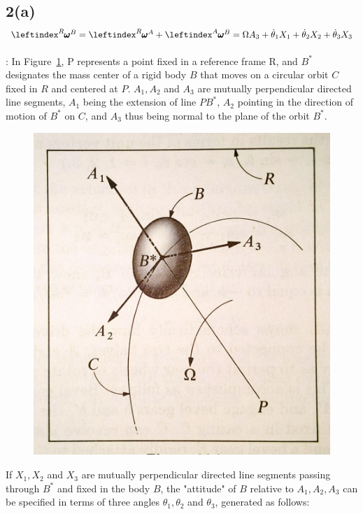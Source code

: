 \subsection{2(a) $\lx{^R}{\pmb \omega}^B = \lx{^R}{\pmb \omega}^A + \lx{^A}{\pmb \omega}^B = \Omega A_3 +\dot \theta_1 X_1 + \dot \theta_2 X_2 + \dot \theta_3 X_3$
}

: In Figure~\ref{2_a}, P represents a point fixed in a reference frame R, and $B^*$ designates the mass center of a rigid body $B$ that moves on a circular orbit $C$ fixed in $R$ and centered at $P$. $A_1, A_2$ and $A_3$ are mutually perpendicular directed line segments, $A_1$ being the extension of line $PB^*$, $A_2$ pointing in the direction of motion of $B^*$ on $C$, and $A_3$ thus being normal to the plane of the orbit $B^*$.

\begin{figure}[H]
    \centering
    \includegraphics[scale = 0.15]{./figs/ProbSet_2/2_a.jpg}
    \caption{}
    \label{2_a}
\end{figure}

If $X_1, X_2$ and $X_3$ are mutually perpendicular directed line segments passing through $B^*$ and fixed in the body $B$, the "attitude" of $B$ relative to $A_1, A_2, A_3$ can be specified in terms of three angles $\theta_1, \theta_2$ and $\theta_3$, generated as follows: 

